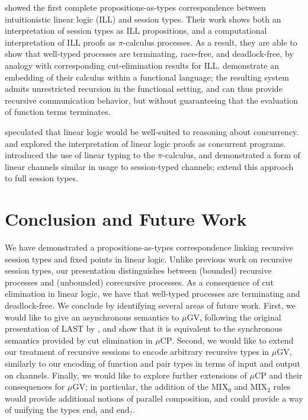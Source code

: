 \documentclass[orivec,envcountsame]{llncs}
\newcommand{\outterm}{\mathrm{end}_!}
\newcommand{\interm}{\mathrm{end}_?}
\newcommand{\mucp}{$\mu\mathrm{CP}$\xspace}
\newcommand{\mugv}{$\mu\mathrm{GV}$\xspace}
\begin{document}
\citet{CairesPfenning10} showed the first complete propositions-as-types correspondence between
intuitionistic linear logic (ILL) and session types.  Their work shows both an interpretation of
session types as ILL propositions, and a computational interpretation of ILL proofs as
$\pi$-calculus processes.  As a result, they are able to show that well-typed processes are
terminating, race-free, and deadlock-free, by analogy with corresponding cut-elimination results for
ILL.  \citet{Toninho13} demonstrate an embedding of their calculus within a functional language; the
resulting system admits unrestricted recursion in the functional setting, and can thus provide
recursive communication behavior, but without guaranteeing that the evaluation of function terms
terminates.

\citet{Girard87} speculated that linear logic would be well-suited to reasoning about concurrency.
\citet{Abramsky92} and \citet{BellinScott94} explored the interpretation of linear logic proofs as
concurrent programs.  \citet{Kobayashi96} introduced the use of linear typing to the $\pi$-calculus,
and demonstrated a form of linear channels similar in usage to session-typed channels;
\citet{Dardha12} extend this approach to full session types.

\section{Conclusion and Future Work}\label{sec:future}

We have demonstrated a propositions-as-types correspondence linking recursive session types and
fixed points in linear logic.  Unlike previous work on recursive session types, our presentation
distinguishes between (bounded) recursive processes and (unbounded) corecursive processes.  As a
consequence of cut elimination in linear logic, we have that well-typed processes are terminating
and deadlock-free.  We conclude by identifying several areas of future work.  First, we would like
to give an asynchronous semantics to \mugv, following the original presentation of LAST by
\citet{GayVasconcelos10}, and show that it is equivalent to the synchronous semantics provided by
cut elimination in \mucp.  Second, we would like to extend our treatment of recursive sessions to
encode arbitrary recursive types in \mugv, similarly to our encoding of function and pair types in
terms of input and output on channels.  Finally, we would like to explore further extensions of
\mucp and their consequences for \mugv; in particular, the addition of the MIX$_0$ and MIX$_2$ rules
would provide additional notions of parallel composition, and could provide a way of unifying the
types $\outterm$ and $\interm$.

\label{sect:bib}


\end{document}
